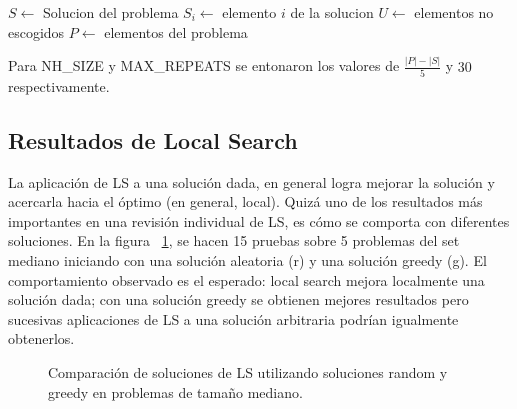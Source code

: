 \documentclass{ci5652}
\begin{document}
\begin{algorithm}[h!]
\DontPrintSemicolon
$S \leftarrow$ Solucion del problema\;
$S_i \leftarrow$ elemento $i$ de la solucion\;
$U \leftarrow$ elementos no escogidos\;
$P \leftarrow$ elementos del problema\;
\end{algorithm}

Para NH\_SIZE y MAX\_REPEATS se entonaron los valores de $\frac{|P|-|S|}{5}$ y $30$ respectivamente.

\subsection{Resultados de Local Search}
La aplicación de LS a una solución dada, en general logra mejorar la solución y acercarla hacia el óptimo (en general, local). Quizá uno de los resultados más importantes en una revisión individual de LS, es cómo se comporta con diferentes soluciones. En la figura ~\ref{fig:localsearch-solution-randomgreedy}, se hacen 15 pruebas sobre 5 problemas del set mediano iniciando con una solución aleatoria (r) y una solución greedy (g).
El comportamiento observado es el esperado: local search mejora localmente una solución dada; con una solución greedy se obtienen mejores resultados pero sucesivas aplicaciones de LS a una solución arbitraria podrían igualmente obtenerlos.

\begin{figure}[]
	\setlength\fboxsep{0pt}
	\setlength\fboxrule{0.5pt}
	\caption{Comparación de soluciones de LS utilizando soluciones random y greedy en problemas de tamaño mediano.}
	\label{fig:localsearch-solution-randomgreedy}
\end{figure}
\end{document}
